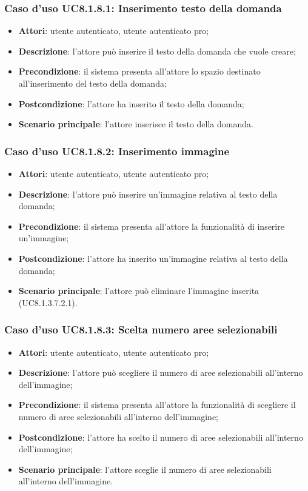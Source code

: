\subsubsection{Caso d'uso UC8.1.8.1: Inserimento testo della domanda}
\begin{itemize}
	\item \textbf{Attori}: utente autenticato, utente autenticato pro;
	\item \textbf{Descrizione}: l'attore può inserire il testo della domanda che vuole creare;
	\item \textbf{Precondizione}: il sistema presenta all'attore lo spazio destinato all'inserimento del testo della domanda;
	\item \textbf{Postcondizione}: l'attore ha inserito il testo della domanda;
	\item \textbf{Scenario principale}: l'attore inserisce il testo della domanda. 
\end{itemize}

\subsubsection{Caso d'uso UC8.1.8.2: Inserimento immagine}
\begin{itemize}
	\item \textbf{Attori}: utente autenticato, utente autenticato pro;
	\item \textbf{Descrizione}: l'attore può inserire un'immagine relativa al testo della domanda;
	\item \textbf{Precondizione}: il sistema presenta all'attore la funzionalità di inserire un'immagine;
	\item \textbf{Postcondizione}: l'attore ha inserito un'immagine relativa al testo della domanda;
	\item \textbf{Scenario principale}: l'attore può eliminare l'immagine inserita (UC8.1.3.7.2.1).			
	\end{itemize}

\subsubsection{Caso d'uso UC8.1.8.3: Scelta numero aree selezionabili}
\begin{itemize}
	\item \textbf{Attori}: utente autenticato, utente autenticato pro;
	\item \textbf{Descrizione}: l'attore può scegliere il numero di aree selezionabili all'interno dell'immagine;
	\item \textbf{Precondizione}: il sistema presenta all'attore la funzionalità di scegliere il numero di aree selezionabili all'interno dell'immagine; 	
	\item \textbf{Postcondizione}: l'attore ha scelto il numero di aree selezionabili all'interno dell'immagine;
	\item \textbf{Scenario principale}: l'attore sceglie il numero di aree selezionabili all'interno dell'immagine. 	
\end{itemize}

